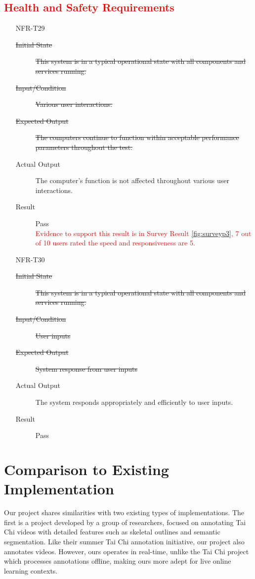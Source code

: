 \documentclass[12pt, titlepage]{article}
\newcommand{\rt}[1]{\textcolor{red}{#1}}
\begin{document}
  \rt{ \subsection{Health and Safety Requirements} }
  \begin{enumerate}
    \item[NFR-T29] \label{NFRT29}
      \begin{description}
      \item[\sout{Initial State}]\sout{ This system is in a typical operational state with all
        components and services running.
      }
      \item[\sout{Input/Condition}]\sout{ Various user interactions.
      }
      \item[\sout{Expected Output}]\sout{ The computers continue to function within acceptable
        performance parameters throughout the test.
      }
      \item[Actual Output] The computer's function is not affected throughout various
        user interactions.
      \item[Result] Pass \\
      \rt{ Evidence to support this result is in Survey Result \ref{fig:surveyp3}, 7 out of 10 users rated the speed and responsiveness are 5. }
      \end{description}
    \item[NFR-T30] \label{NFRT30}
      \begin{description}
      \item[\sout{Initial State}]\sout{ This system is in a typical operational state with all
        components and services running.
      }
      \item[\sout{Input/Condition}]\sout{ User inputs
      }
      \item[\sout{Expected Output}]\sout{ System response from user inputs
      }
      \item[Actual Output] The system responds appropriately and efficiently to user
        inputs.
      \item[Result] Pass
      \end{description}
    \end{enumerate}

\section{Comparison to Existing Implementation}

Our project shares similarities with two existing types of implementations. The
first is a project developed by a group of researchers, focused on annotating
Tai Chi videos with detailed features such as skeletal outlines and semantic
segmentation. Like their summer Tai Chi annotation initiative, our project also
annotates videos. However, ours operates in real-time, unlike the Tai Chi
project which processes annotations offline, making ours more adept for live
online learning contexts.
\end{document}
